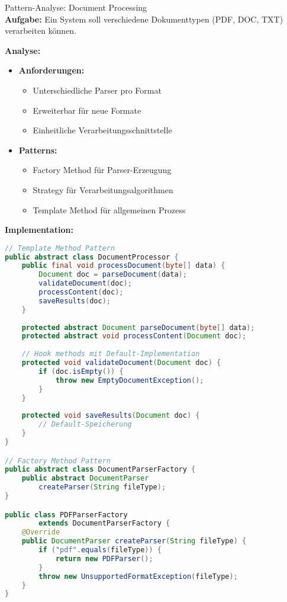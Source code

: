 \begin{example2}[breakable]{Pattern-Analyse: Document Processing}\\
\textbf{Aufgabe:} Ein System soll verschiedene Dokumenttypen (PDF, DOC, TXT) verarbeiten können.

\textbf{Analyse:}
\begin{itemize}
    \item \textbf{Anforderungen:}
    \begin{itemize}
        \item Unterschiedliche Parser pro Format
        \item Erweiterbar für neue Formate
        \item Einheitliche Verarbeitungsschnittstelle
    \end{itemize}
    
    \item \textbf{Patterns:}
    \begin{itemize}
        \item Factory Method für Parser-Erzeugung
        \item Strategy für Verarbeitungsalgorithmen
        \item Template Method für allgemeinen Prozess
    \end{itemize}
\end{itemize}

\textbf{Implementation:}
\begin{lstlisting}[language=Java, style=basesmol]
// Template Method Pattern
public abstract class DocumentProcessor {
    public final void processDocument(byte[] data) {
        Document doc = parseDocument(data);
        validateDocument(doc);
        processContent(doc);
        saveResults(doc);
    }
    
    protected abstract Document parseDocument(byte[] data);
    protected abstract void processContent(Document doc);
    
    // Hook methods mit Default-Implementation
    protected void validateDocument(Document doc) {
        if (doc.isEmpty()) {
            throw new EmptyDocumentException();
        }
    }
    
    protected void saveResults(Document doc) {
        // Default-Speicherung
    }
}

// Factory Method Pattern
public abstract class DocumentParserFactory {
    public abstract DocumentParser 
        createParser(String fileType);
}

public class PDFParserFactory 
        extends DocumentParserFactory {
    @Override
    public DocumentParser createParser(String fileType) {
        if ("pdf".equals(fileType)) {
            return new PDFParser();
        }
        throw new UnsupportedFormatException(fileType);
    }
}


\end{lstlisting}
\end{example2}

